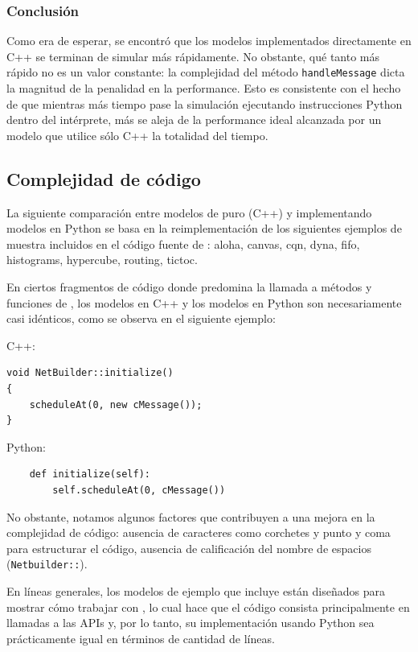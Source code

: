 \documentclass[]{article}
\begin{document}
\subsubsection{Conclusión}

Como era de esperar, se encontró que los modelos implementados directamente en
C++ se terminan de simular más rápidamente. No obstante, qué tanto más rápido
no es un valor constante: la complejidad del método \verb!handleMessage! dicta
la magnitud de la penalidad en la performance. Esto es consistente con el hecho
de que mientras más tiempo pase la simulación ejecutando instrucciones Python
dentro del intérprete, más se aleja de la performance ideal alcanzada por un
modelo que utilice sólo C++ la totalidad del tiempo.

\subsection{Complejidad de código}

La siguiente comparación entre modelos de \omnetpp{} puro (C++) y \omnetpp{}
implementando modelos en Python se basa en la reimplementación de los
siguientes ejemplos de muestra incluidos en el código fuente de \omnetpp{}: aloha,
canvas, cqn, dyna, fifo, histograms, hypercube, routing, tictoc.

En ciertos fragmentos de código donde predomina la llamada a métodos y
funciones de \omnetpp{}, los modelos en C++ y los modelos en Python son
necesariamente casi idénticos, como se observa en el siguiente ejemplo:

\noindent C++:

\begin{verbatim}
void NetBuilder::initialize()
{
    scheduleAt(0, new cMessage());
}
\end{verbatim}

\noindent Python:

\begin{verbatim}
    def initialize(self):
        self.scheduleAt(0, cMessage())
\end{verbatim}

No obstante, notamos algunos factores que contribuyen a una mejora en la
complejidad de código: ausencia de caracteres como corchetes y punto y coma
para estructurar el código, ausencia de calificación del nombre de espacios
(\verb!Netbuilder::!).

En líneas generales, los modelos de ejemplo que incluye \omnetpp{} están diseñados
para mostrar cómo trabajar con \omnetpp{}, lo cual hace que el código consista
principalmente en llamadas a las APIs y, por lo tanto, su implementación usando
Python sea prácticamente igual en términos de cantidad de líneas.
\end{document}
